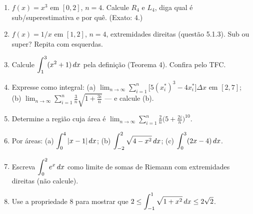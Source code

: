 \begin{exercicios}
\begin{enumerate}[leftmargin=1.6em, itemsep=2pt, label=\textbf{3.\arabic*}]
\item $f(x)=x^3$ em $[0,2]$, $n=4$. Calcule $R_4$ e $L_4$, diga qual é sub/superestimativa e por quê. (Exato: $4$.)
\item $f(x)=1/x$ em $[1,2]$, $n=4$, extremidades direitas (questão 5.1.3). Sub ou super? Repita com esquerdas.
\item Calcule $\displaystyle\int_1^3(x^2+1)\,dx$ pela definição (Teorema 4). Confira pelo TFC.
\item Expresse como integral: (a) $\displaystyle\lim_{n\to\infty}\sum_{i=1}^n\big[5(x_i^*)^3-4x_i^*\big]\Delta x$ em $[2,7]$; (b) $\displaystyle\lim_{n\to\infty}\sum_{i=1}^n\frac3n\sqrt{1+\frac{3i}{n}}$ --- e calcule (b).
\item Determine a região cuja área é $\displaystyle\lim_{n\to\infty}\sum_{i=1}^n\frac2n\Big(5+\frac{2i}{n}\Big)^{10}$.
\item Por áreas: (a) $\displaystyle\int_0^4|x-1|\,dx$; \;(b) $\displaystyle\int_{-2}^2\sqrt{4-x^2}\,dx$; \;(c) $\displaystyle\int_0^3(2x-4)\,dx$.
\item Escreva $\displaystyle\int_0^2 e^{x}\,dx$ como limite de somas de Riemann com extremidades direitas (não calcule).
\item Use a propriedade 8 para mostrar que $\displaystyle 2\le\int_{-1}^1\sqrt{1+x^2}\,dx\le 2\sqrt2$.
\end{enumerate}
\end{exercicios}
